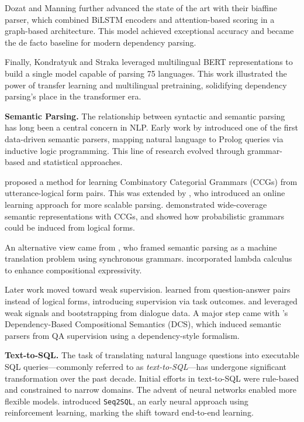 Dozat and Manning \cite{dozat2017deep} further advanced the state of the art with their biaffine parser, which combined BiLSTM encoders and attention-based scoring in a graph-based architecture. This model achieved exceptional accuracy and became the de facto baseline for modern dependency parsing.

Finally, Kondratyuk and Straka \cite{kondratyuk2019udpipe} leveraged multilingual BERT representations to build a single model capable of parsing 75 languages. This work illustrated the power of transfer learning and multilingual pretraining, solidifying dependency parsing's place in the transformer era.

\textbf{Semantic Parsing.} The relationship between syntactic and semantic parsing has long been a central concern in NLP. Early work by \citet{zelle1996} introduced one of the first data-driven semantic parsers, mapping natural language to Prolog queries via inductive logic programming. This line of research evolved through grammar-based and statistical approaches.

\citet{zettlemoyer2005} proposed a method for learning Combinatory Categorial Grammars (CCGs) from utterance-logical form pairs. This was extended by \citet{zettlemoyer2007online}, who introduced an online learning approach for more scalable parsing. \citet{bos2004} demonstrated wide-coverage semantic representations with CCGs, and \citet{kwiatkowski2010} showed how probabilistic grammars could be induced from logical forms.

An alternative view came from \citet{wong2006learning}, who framed semantic parsing as a machine translation problem using synchronous grammars. \citet{wong2007} incorporated lambda calculus to enhance compositional expressivity.

Later work moved toward weak supervision. \citet{clarke2010} learned from question-answer pairs instead of logical forms, introducing supervision via task outcomes. \citet{goldwasser2011confidence} and \citet{artzi2011} leveraged weak signals and bootstrapping from dialogue data. A major step came with \citet{liang2013learning}'s Dependency-Based Compositional Semantics (DCS), which induced semantic parsers from QA supervision using a dependency-style formalism.

\textbf{Text-to-SQL.} The task of translating natural language questions into executable SQL queries---commonly referred to as \emph{text-to-SQL}---has undergone significant transformation over the past decade. Initial efforts in text-to-SQL were rule-based and constrained to narrow domains. The advent of neural networks enabled more flexible models. \citet{zhong2017seq2sql} introduced \texttt{Seq2SQL}, an early neural approach using reinforcement learning, marking the shift toward end-to-end learning.

